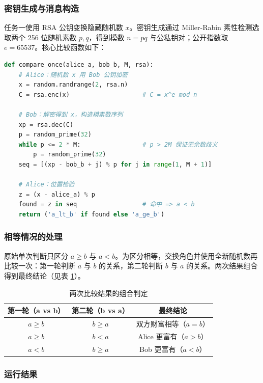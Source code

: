 \documentclass{SYSUReport}
\begin{document}
\subsubsection{密钥生成与消息构造}

任务一使用 RSA 公钥变换隐藏随机数 $x$。密钥生成通过 Miller-Rabin 素性检测选取两个 256 位随机素数 $p, q$，得到模数 $n = pq$ 与公私钥对；公开指数取 $e = 65537$。核心比较函数如下：

\begin{lstlisting}[language=Python, caption={任务一核心：单次比较（公钥变换 + 模素数序列 + 位置检验）}]
def compare_once(alice_a, bob_b, M, rsa):
    # Alice：随机数 x 用 Bob 公钥加密
    x = random.randrange(2, rsa.n)
    C = rsa.enc(x)                    # C = x^e mod n

    # Bob：解密得到 x，构造模素数序列
    xp = rsa.dec(C)
    p = random_prime(32)
    while p <= 2 * M:                 # p > 2M 保证无余数歧义
        p = random_prime(32)
    seq = [(xp - bob_b + j) % p for j in range(1, M + 1)]

    # Alice：位置检验
    z = (x - alice_a) % p
    found = z in seq                  # 命中 => a < b
    return ('a_lt_b' if found else 'a_ge_b')
\end{lstlisting}

\subsubsection{相等情况的处理}

原始单次判断只区分 $a \ge b$ 与 $a < b$。为区分相等，交换角色并使用全新随机数再比较一次：第一轮判断 $a$ 与 $b$ 的关系，第二轮判断 $b$ 与 $a$ 的关系。两次结果组合得到最终结论（见表 \ref{tab:yresult}）。

\begin{table}[htbp]
\centering
\caption{两次比较结果的组合判定}
\label{tab:yresult}
\begin{tabular}{ccc}
\toprule
\textbf{第一轮（a vs b）} & \textbf{第二轮（b vs a）} & \textbf{最终结论} \\
\midrule
$a \ge b$ & $b \ge a$ & 双方财富相等（$a = b$）\\
$a \ge b$ & $b < a$ & Alice 更富有（$a > b$）\\
$a < b$ & $b \ge a$ & Bob 更富有（$a < b$）\\
\bottomrule
\end{tabular}
\end{table}

\subsubsection{运行结果}
\end{document}
